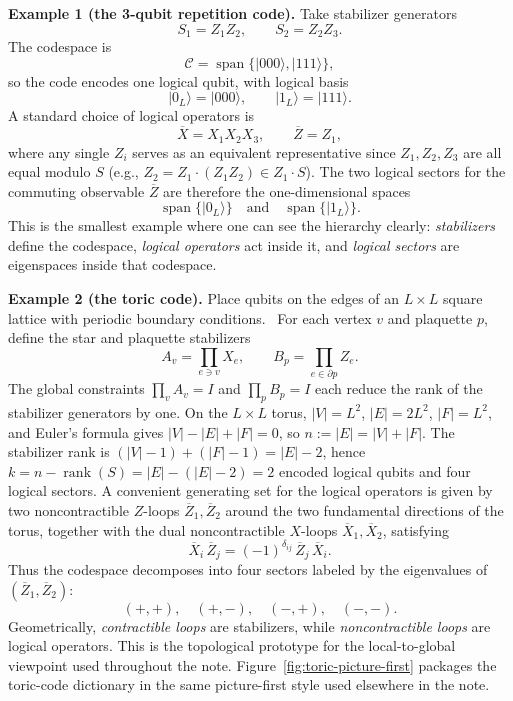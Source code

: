 \documentclass[10pt]{article}
\theoremstyle{compactdef}
\begin{document}
\textbf{Example 1 (the 3-qubit repetition code).}
Take stabilizer generators
\[
S_1=Z_1Z_2,
\qquad
S_2=Z_2Z_3.
\]
The codespace is
\[
\mathcal C=\operatorname{span}\{|000\rangle,|111\rangle\},
\]
so the code encodes one logical qubit, with logical basis
\[
|0_L\rangle=|000\rangle,
\qquad
|1_L\rangle=|111\rangle.
\]
A standard choice of logical operators is
\[
\overline X=X_1X_2X_3,
\qquad
\overline Z=Z_1,
\]
where any single $Z_i$ serves as an equivalent representative since $Z_1,Z_2,Z_3$ are all equal modulo $S$ (e.g., $Z_2 = Z_1\cdot(Z_1Z_2)\in Z_1\cdot S$). The two logical sectors for the commuting observable $\overline Z$ are therefore the one-dimensional spaces
\[
\operatorname{span}\{|0_L\rangle\}
\quad\text{and}\quad
\operatorname{span}\{|1_L\rangle\}.
\]
This is the smallest example where one can see the hierarchy clearly: \emph{stabilizers} define the codespace, \emph{logical operators} act inside it, and \emph{logical sectors} are eigenspaces inside that codespace.

\textbf{Example 2 (the toric code).}
Place qubits on the edges of an $L\times L$ square lattice with periodic boundary conditions.~\cite{Kitaev2003} For each vertex $v$ and plaquette $p$, define the star and plaquette stabilizers
\[
A_v=\prod_{e\ni v} X_e,
\qquad
B_p=\prod_{e\in \partial p} Z_e.
\]
The global constraints $\prod_v A_v=I$ and $\prod_p B_p=I$ each reduce the rank of the stabilizer generators by one. On the $L\times L$ torus, $|V|=L^2$, $|E|=2L^2$, $|F|=L^2$, and Euler's formula gives $|V|-|E|+|F|=0$, so $n:=|E|=|V|+|F|$. The stabilizer rank is $(|V|-1)+(|F|-1)=|E|-2$, hence $k=n-\operatorname{rank}(S)=|E|-(|E|-2)=2$ encoded logical qubits and four logical sectors. A convenient generating set for the logical operators is given by two noncontractible $Z$-loops $\overline Z_1,\overline Z_2$ around the two fundamental directions of the torus, together with the dual noncontractible $X$-loops $\overline X_1,\overline X_2$, satisfying
\[
\overline X_i\,\overline Z_j=(-1)^{\delta_{ij}}\,\overline Z_j\,\overline X_i.
\]
Thus the codespace decomposes into four sectors labeled by the eigenvalues of $(\overline Z_1,\overline Z_2)$:
\[
(+,+),\quad (+,-),\quad (-,+),\quad (-,-).
\]
Geometrically, \emph{contractible loops} are stabilizers, while \emph{noncontractible loops} are logical operators. This is the topological prototype for the local-to-global viewpoint used throughout the note. Figure~\ref{fig:toric-picture-first} packages the toric-code dictionary in the same picture-first style used elsewhere in the note.
\end{document}
